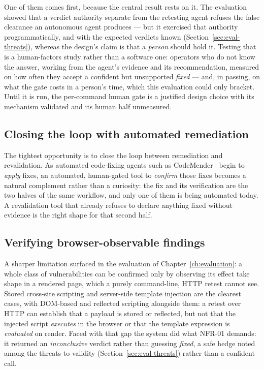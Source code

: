 One of them comes first, because the central result rests on it. The evaluation showed
that a verdict authority separate from the retesting agent refuses the false clearance an
autonomous agent produces --- but it exercised that authority programmatically, and with
the expected verdicts known
(Section~\ref{sec:eval-threats}), whereas the design's claim is that a \emph{person}
should hold it. Testing that is a human-factors study rather than a software one:
operators who do not know the answer, working from the agent's evidence and its
recommendation, measured on how often they accept a confident but unsupported
\emph{fixed} --- and, in passing, on what the gate costs in a person's time, which this
evaluation could only bracket. Until it is run, the per-command human gate is a justified
design choice with its mechanism validated and its human half unmeasured.

\subsection{Closing the loop with automated remediation}
\label{subsec:future-remediation}

The tightest opportunity is to close the loop between remediation and revalidation.
As automated code-fixing agents such as CodeMender~\cite{codemender} begin to
\emph{apply} fixes, an automated, human-gated tool to \emph{confirm} those fixes
becomes a natural complement rather than a curiosity: the fix and its verification
are the two halves of the same workflow, and only one of them is being automated
today. A revalidation tool that already refuses to declare anything fixed without
evidence is the right shape for that second half.

\subsection{Verifying browser-observable findings}
\label{subsec:future-browser}

A sharper limitation surfaced in the evaluation of
Chapter~\ref{ch:evaluation}: a whole class of vulnerabilities can be confirmed only by
observing its effect take shape in a rendered page, which a purely command-line, HTTP
retest cannot see. Stored cross-site scripting and server-side template injection are
the clearest cases, with DOM-based and reflected scripting alongside them: a retest
over HTTP can establish that a payload is stored or reflected, but not that the injected
script \emph{executes} in the browser or that the template expression is
\emph{evaluated} on render. Faced with that gap the system did what NFR-01 demands:
it returned an \emph{inconclusive} verdict rather than guessing \emph{fixed}, a safe
hedge noted among the threats to validity (Section~\ref{sec:eval-threats}) rather than a
confident call.

